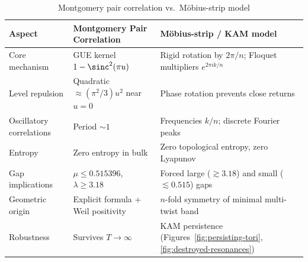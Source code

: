 \documentclass[11pt,a4paper]{article}
\begin{document}
\begin{table}[ht]
\centering
\small
\caption{Montgomery pair correlation vs.\ M\"obius-strip model}
\label{tab:montgomery-vs-mobius}
\begin{tabular}{l p{5.8cm} p{5.8cm}}
\toprule
Aspect & Montgomery Pair Correlation & M\"obius-strip / KAM model \\
\midrule
Core mechanism & GUE kernel $1 - \sinc^2(\pi u)$ & Rigid rotation by $2\pi/n$; Floquet multipliers $e^{2\pi i k / n}$ \\
Level repulsion & Quadratic $\approx (\pi^2/3) u^2$ near $u=0$ & Phase rotation prevents close returns \\
Oscillatory correlations & Period $\sim 1$ & Frequencies $k/n$; discrete Fourier peaks \\
Entropy & Zero entropy in bulk & Zero topological entropy, zero Lyapunov \\
Gap implications & $\mu \le 0.515396$, $\lambda \ge 3.18$ & Forced large ($\gtrsim 3.18$) and small ($\lesssim 0.515$) gaps \\
Geometric origin & Explicit formula + Weil positivity & $n$-fold symmetry of minimal multi-twist band \\
Robustness & Survives $T\to\infty$ & KAM persistence (Figures~\ref{fig:persisting-tori}, \ref{fig:destroyed-resonances}) \\
\bottomrule
\end{tabular}
\end{table}
\end{document}
